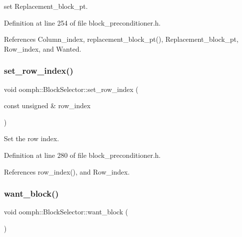 set Replacement\+\_\+block\+\_\+pt. 



Definition at line 254 of file block\+\_\+preconditioner.\+h.



References Column\+\_\+index, replacement\+\_\+block\+\_\+pt(), Replacement\+\_\+block\+\_\+pt, Row\+\_\+index, and Wanted.

\mbox{\label{classoomph_1_1BlockSelector_ad0fb48a7b31189c891013bb5de6ba938}} 
\subsubsection{\texorpdfstring{set\+\_\+row\+\_\+index()}{set\_row\_index()}}
{\footnotesize\ttfamily void oomph\+::\+Block\+Selector\+::set\+\_\+row\+\_\+index (\begin{DoxyParamCaption}\item[{const unsigned \&}]{row\+\_\+index }\end{DoxyParamCaption})\hspace{0.3cm}{\ttfamily [inline]}}



Set the row index. 



Definition at line 280 of file block\+\_\+preconditioner.\+h.



References row\+\_\+index(), and Row\+\_\+index.

\mbox{\label{classoomph_1_1BlockSelector_a2ac783d94aa3339ce43fc40e269ea628}} 
\subsubsection{\texorpdfstring{want\+\_\+block()}{want\_block()}}
{\footnotesize\ttfamily void oomph\+::\+Block\+Selector\+::want\+\_\+block (\begin{DoxyParamCaption}{ }\end{DoxyParamCaption})\hspace{0.3cm}{\ttfamily [inline]}}




